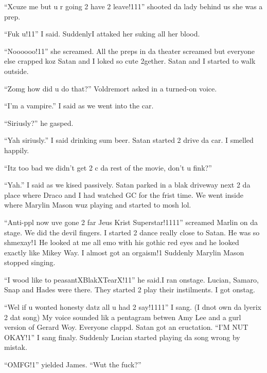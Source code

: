 \enquote{Xcuze me but u r going 2 have 2 leave!111} shooted da lady behind us she was a prep.

\enquote{Fuk u!11} I said. Suddenly\dotfill\newline I attaked her suking all her blood.

\begin{sloppypar}
    \enquote{Noooooo!11} she screamed. All the preps in da theater screamed but everyone else crapped koz Satan and I loked so cute 2gether. Satan and I started to walk outside.    
\end{sloppypar}

\enquote{Zomg how did u do that?} Voldremort asked in a turned-on voice.

\enquote{I'm a vampire.} I said as we went into the car.

\enquote{Siriusly?} he gasped.

\enquote{Yah siriusly.} I said drinking sum beer. Satan started 2 drive da car. I smelled happily.

\enquote{Itz too bad we didn't get 2 c da rest of the movie, don't u fink?}

\enquote{Yah.} I said as we kised passively. Satan parked in a blak driveway next 2 da place where Draco and I had watched GC for the frist time. We went inside where Marylin Mason wuz playing and started to mosh lol.

\begin{sloppypar}
    \enquote{Anti-ppl now uve gone 2 far Jeus Krist Superstar!1111} screamed Marlin on da stage. We did the devil fingers. I started 2 dance really close to Satan. He was so shmexay!1 He looked at me all emo with his gothic red eyes and he looked exactly like Mikey Way. I almost got an orgaism!1 Suddenly Marylin Mason stopped singing.    
\end{sloppypar}

\enquote{I wood like to peasant\dotfill XBlakXTearX!11} he said.\newline I ran onstage. Lucian, Samaro, Snap and Hades were there. They started 2 play their instilments. I got onstag.

\enquote{Wel if u wonted honesty datz all u had 2 say!1111} I sang. (I dnot own da lyerix 2 dat song) My voice sounded lik a pentagram betwen Amy Lee and a gurl version of Gerard Woy. Everyone clappd. Satan got an eructation. \enquote{I'M NUT OKAY!1} I sang finaly. Suddenly Lucian started playing da song wrong by mistak.

\enquote{OMFG!1} yielded James. \enquote{Wut the fuck?}

